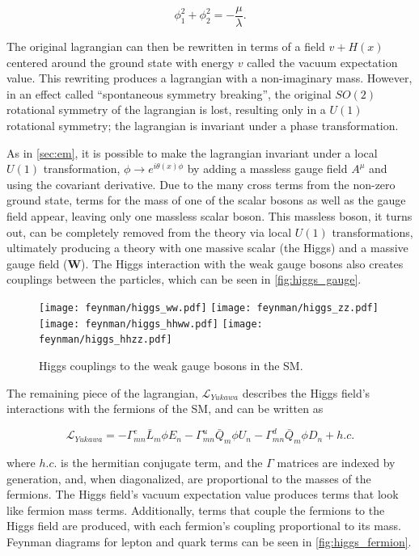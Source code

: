\begin{equation}
\phi_1^2 + \phi_2^2 = - \frac{\mu}{\lambda} . 
\end{equation}

The original lagrangian can then be rewritten in terms of a field $v + H(x)$ centered around the ground state with energy $v$ called the vacuum expectation value. This rewriting produces a lagrangian with a non-imaginary mass. However, in an effect called ``spontaneous symmetry breaking'', the original $SO(2)$ rotational symmetry of the lagrangian is lost, resulting only in a $U(1)$ rotational symmetry; the lagrangian is invariant under a phase transformation.

As in \autoref{sec:em}, it is possible to make the lagrangian invariant under a local $U(1)$ transformation, $\phi \rightarrow e^{i\theta(x)\phi}$ by adding a massless gauge field $A^\mu$ and using the covariant derivative. Due to the many cross terms from the non-zero ground state, terms for the mass of one of the scalar bosons as well as the gauge field appear, leaving only one massless scalar boson. This massless boson, it turns out, can be completely removed from the theory via local $U(1)$ transformations, ultimately producing a theory with one massive scalar (the Higgs) and a massive gauge field ($\bm{W}$). The Higgs interaction with the weak gauge bosons also creates couplings between the particles, which can be seen in \autoref{fig:higgs_gauge}.

\begin{centering}
\begin{figure}[!hbt]
\myfloatalign
\texttt{[image: feynman/higgs\_ww.pdf]}
\texttt{[image: feynman/higgs\_zz.pdf]}
\texttt{[image: feynman/higgs\_hhww.pdf]}
\texttt{[image: feynman/higgs\_hhzz.pdf]}
\caption{Higgs couplings to the weak gauge bosons in the \ac{SM}.}
\label{fig:higgs_gauge}
\end{figure}
\end{centering}

The remaining piece of the lagrangian, $\mathcal{L}_{Yukawa}$ describes the Higgs field's interactions with the fermions of the \ac{SM}, and can be written as

\begin{equation}
\mathcal{L}_{Yukawa} = -\Gamma^e_{mn}\bar{L}_m \phi E_n -\Gamma^u_{mn}\bar{Q}_m \phi U_n -\Gamma^d_{mn}\bar{Q}_m \phi D_n + h.c.
\end{equation} 

where $h.c.$ is the hermitian conjugate term, and the $\Gamma$ matrices are indexed by generation, and, when diagonalized, are proportional to the masses of the fermions. The Higgs field's vacuum expectation value produces terms that look like fermion mass terms. Additionally, terms that couple the fermions to the Higgs field are produced, with each fermion's coupling proportional to its mass. Feynman diagrams for lepton and quark terms can be seen in \autoref{fig:higgs_fermion}.


